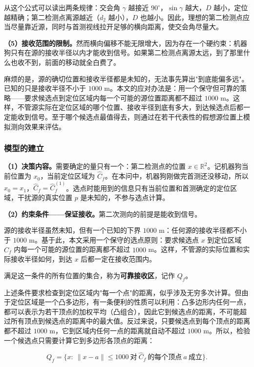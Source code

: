 从这个公式可以读出两条规律：交会角 $\gamma$ 越接近 $90^\circ$，$\sin\gamma$ 越大，$D$ 越小，定位越精确；第二检测点离源越近（$d_2$ 越小），$D$ 也越小。因此，理想的第二检测点应当尽量靠近源，同时与首测视线拉开足够的横向距离，使交会角尽量大。

\textbf{（5）接收范围的限制。}然而横向偏移不能无限增大，因为存在一个硬约束：机器狗只有在源的接收半径以内才能收到信号。如果第二检测点离源太远，到了那里什么也收不到，前面的移动就全白费了。

麻烦的是，源的确切位置和接收半径都是未知的，无法事先算出"到底能偏多远"。已知的只是接收半径不小于 $1000$ m。本文的应对办法是：用一个保守但可靠的策略——要求候选点到定位区域内每一个可能的源位置距离都不超过 $1000$ m。这样，不管源实际在定位区域的哪个位置、接收半径到底有多大，到达候选点后都一定能收到信号。至于哪个候选点最值得去，则通过在若干代表性的假想源位置上模拟测向效果来评估。

\subsubsection{模型的建立}\label{sec:q2-2}

\textbf{（1）决策内容。}需要确定的量只有一个：第二检测点的位置 $x\in\mathbb R^2$。记机器狗当前位置为 $x_0$，当前定位区域为 $\widehat C_f$。在本问中，机器狗刚做完首测还没移动，所以 $x_0=x_1$，$\widehat C_f=\widehat C_f^{(1)}$。选点时能用到的信息只有当前位置和首测确定的定位区域，干扰源的真实位置 $p$ 是未知的，不参与选点计算。

\textbf{（2）约束条件——保证接收。}第二次测向的前提是能收到信号。

源的接收半径虽然未知，但有一个已知的下界 $1000$ m：任何源的接收半径都不小于 $1000$ m。基于此，本文采用一个保守的选点原则：要求候选点 $x$ 到定位区域 $\widehat C_f$ 内每一个可能的源位置的距离都不超过 $1000$ m。这样，不管源的实际位置和实际接收半径如何，到达 $x$ 后都一定在接收范围内。

满足这一条件的所有位置的集合，称为\textbf{可靠接收区}，记作 $Q_f$。

上述条件要求检查到定位区域内"每一个点"的距离，似乎涉及无穷多次计算。但由于定位区域是一个凸多边形，有一条便利的性质可以利用：凸多边形内任何一点，都可以表示为若干顶点的加权平均（凸组合），因此它到候选点的距离，不可能超过所有顶点到候选点的距离中的最大值。反过来说，只要候选点到每个顶点的距离都不超过 $1000$ m，它到区域内任何一点的距离就自动不超过 $1000$ m。所以，检验一个候选点只需要计算它到多边形各顶点的距离：

\begin{equation}\label{eq:q2-3}
Q_f=\bigl\{x:\ \|x-a\|\le1000\ \text{对}\ \widehat C_f\ \text{的每个顶点}\ a\ \text{成立}\bigr\}.
\end{equation}

